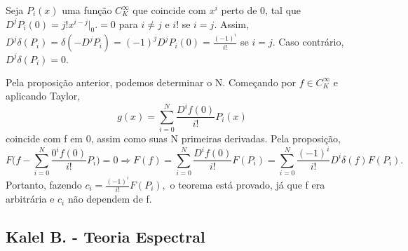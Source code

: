 \documentclass[MeasureTheory/measure_theory.tex]{subfiles}
\begin{document}
\begin{proof*}
	Seja \(P_{i}(x)\) uma função \(C_{K}^{\infty}\) que coincide com \(x^{i}\) perto de 0, tal que \(D^{j}P_{i}(0) = j!x^{i-j}\biggl|_{0}^{}\biggr. =0\) para \(i\neq j\) e \(i!\) se \(i= j\). Assim,
	\(D^{j}\delta (P_{i}) = \delta (-D^{j}P_{i}) = (-1)^{j}D^{j}P_{i}(0) = \frac{(-1)^{i}}{i!}\) se \(i = j\). Caso contrário, \(D^{j}\delta (P_{i}) = 0.\)

	Pela proposição anterior, podemos determinar o N. Começando por \(f\in C_{K}^{\infty}\) e aplicando Taylor,
	\[
		g(x) = \sum\limits_{i=0}^{N}\frac{D^{i}f(0)}{i!}P_{i}(x)
	\]
	coincide com f em 0, assim como suas N primeiras derivadas. Pela proposição,
	\[
		F \biggl(f - \sum\limits_{i=0}^{N}\frac{0^{i}f(0)}{i!}P_{i}\biggr) = 0 \Rightarrow F(f) = \sum\limits_{i=0}^{N}\frac{D^{i}f(0)}{i!}F(P_{i}) = \sum\limits_{i=0}^{N} \frac{(-1)^{i}}{i!}D^{i}\delta (f)F(P_{i}).
	\]
	Portanto, fazendo \(c_{i} = \frac{(-1)^{i}}{i!}F(P_{i}),\) o teorema está provado, já que f era arbitrária e \(c_{i}\) não dependem de f. \qedsymbol
\end{proof*}

\subsection{Kalel B. - Teoria Espectral}
\end{document}
